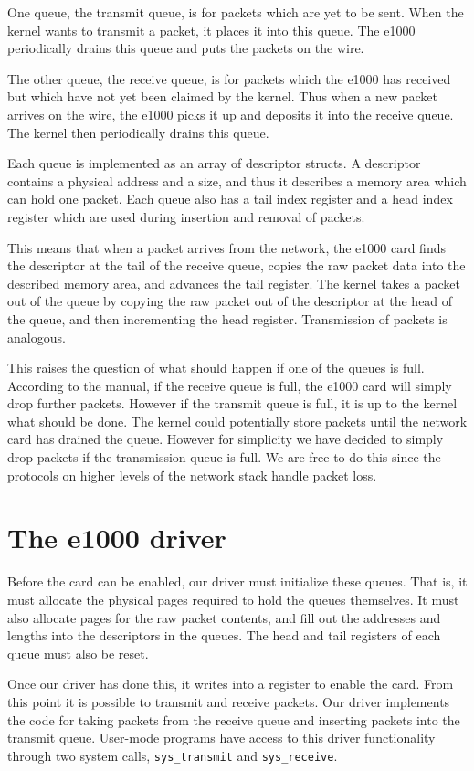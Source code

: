 \documentclass{report}
\begin{document}
One queue, the transmit queue, is for packets which are yet to be sent. When
the kernel wants to transmit a packet, it places it into this queue. The e1000
periodically drains this queue and puts the packets on the wire.

The other queue, the receive queue, is for packets which the e1000 has
received but which have not yet been claimed by the kernel. Thus when a new
packet arrives on the wire, the e1000 picks it up and deposits it into the
receive queue. The kernel then periodically drains this queue.

Each queue is implemented as an array of descriptor structs. A descriptor
contains a physical address and a size, and thus it describes a memory area
which can hold one packet. Each queue also has a tail index register and a
head index register which are used during insertion and removal of packets.

This means that when a packet arrives from the network, the e1000 card finds
the descriptor at the tail of the receive queue, copies the raw packet data
into the described memory area, and advances the tail register. The kernel
takes a packet out of the queue by copying the raw packet out of the
descriptor at the head of the queue, and then incrementing the head register.
Transmission of packets is analogous.

This raises the question of what should happen if one of the queues is full.
According to the manual, if the receive queue is full, the e1000 card will
simply drop further packets. However if the transmit queue is full, it is up
to the kernel what should be done. The kernel could potentially store packets
until the network card has drained the queue. However for simplicity we have
decided to simply drop packets if the transmission queue is full. We are free
to do this since the protocols on higher levels of the network stack handle
packet loss.

\section{The e1000 driver}
Before the card can be enabled, our driver must initialize these queues. That
is, it must allocate the physical pages required to hold the queues
themselves. It must also allocate pages for the raw packet contents, and fill
out the addresses and lengths into the descriptors in the queues. The head and
tail registers of each queue must also be reset. 

Once our driver has done this, it writes into a register to enable the card.
From this point it is possible to transmit and receive packets. Our driver
implements the code for taking packets from the receive queue and inserting
packets into the transmit queue. User-mode programs have access to this driver
functionality through two system calls, \texttt{sys\_transmit} and
\texttt{sys\_receive}.
\end{document}
